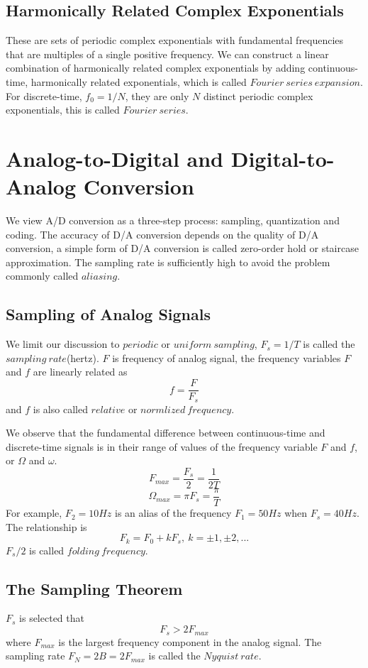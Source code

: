 \documentclass[10pt,a4paper,oneside]{article}
\begin{document}
\subsection{Harmonically Related Complex Exponentials}
These are sets of periodic complex exponentials with fundamental frequencies that are multiples of a single positive frequency. We can construct a linear combination of harmonically related complex exponentials by adding continuous-time, harmonically related exponentials, which is called $Fourier\ series\ expansion$. For discrete-time, $f_0=1/N$, they are only $N$ distinct periodic complex exponentials, this is called $Fourier\ series$.
\section{Analog-to-Digital and Digital-to-Analog Conversion}
We view A/D conversion as a three-step process: sampling, quantization and coding. The accuracy of D/A conversion depends on the quality of D/A conversion, a simple form of D/A conversion is called zero-order hold or staircase approximation. The sampling rate is sufficiently high to avoid the problem commonly called $aliasing$.
\subsection{Sampling of Analog Signals}
We limit our discussion to $periodic$ or $uniform\ sampling$, $F_s=1/T$ is called the $sampling\ rate$(hertz). $F$ is frequency of analog signal, the frequency variables $F$ and $f$ are linearly related as
\[
f=\frac{F}{F_s}
\]
and $f$ is also called $relative$ or $normlized\ frequency$.

We observe that the fundamental difference between continuous-time and discrete-time signals is in their range of values of the frequency variable $F$ and $f$, or $\Omega$ and $\omega$.
\[
F_{max}=\frac{F_s}{2}=\frac{1}{2T}
\]
\[
\Omega_{max} = \pi F_s = \frac{\pi}{T}
\]
For example, $F_2=10Hz$ is an alias of the frequency $F_1=50Hz$ when $F_s=40Hz$. The relationship is
\[
F_k = F_0+kF_s,\ k=\pm1,\pm2,...
\]
$F_s/2$ is called $folding\ frequency$.
\subsection{The Sampling Theorem}
$F_s$ is selected that 
\[
F_s>2F_{max}
\]
 where $F_{max}$ is the largest frequency component in the analog signal. The sampling rate $F_N=2B=2F_{max}$ is called the $Nyquist\ rate$. 
\end{document}
